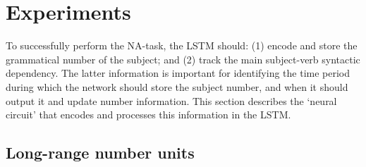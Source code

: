 \section{Experiments}\label{sec:results}
To successfully perform the NA-task, the LSTM should: (1) encode and store the grammatical number of the subject; and (2) track the main subject-verb syntactic dependency. The latter information is important for identifying the time period during which the network should store the subject number, and when it should output it and update number information. This section describes the `neural circuit' that encodes and processes this information in the LSTM.

\subsection{Long-range number units}\label{subsec:ablation}
